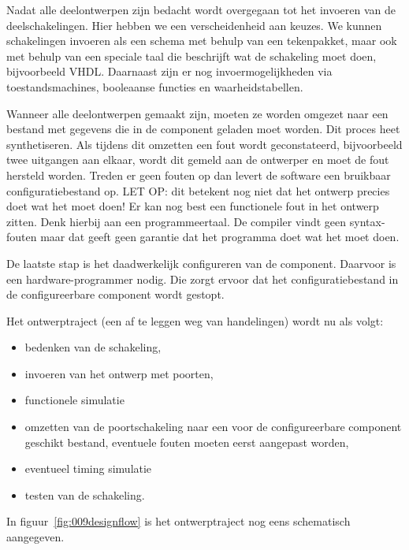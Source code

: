 \documentclass[a4paper,12pt,fleqn,twoside]{book}
\begin{document}
Nadat alle deelontwerpen zijn bedacht wordt overgegaan tot het invoeren van de
deelschakelingen. Hier hebben we een verscheidenheid aan keuzes. We kunnen
schakelingen invoeren als een schema met behulp van een tekenpakket, maar ook
met behulp van een speciale taal die beschrijft wat de schakeling moet doen,
bijvoorbeeld VHDL. Daarnaast zijn er nog invoermogelijkheden via
toestandsmachines, booleaanse functies en waarheidstabellen.

Wanneer alle deelontwerpen gemaakt zijn, moeten ze worden omgezet naar een
bestand met gegevens die in de component geladen moet worden. Dit proces heet
synthetiseren. Als tijdens dit omzetten een fout wordt geconstateerd,
bijvoorbeeld twee uitgangen aan elkaar, wordt dit gemeld aan de ontwerper en
moet de fout hersteld worden. Treden er geen fouten op dan levert de software
een bruikbaar configuratiebestand op. LET OP: dit betekent nog niet dat het
ontwerp precies doet wat het moet doen! Er kan nog best een functionele fout
in het ontwerp zitten. Denk hierbij aan een programmeertaal. De compiler vindt
geen syntax-fouten maar dat geeft geen garantie dat het programma doet wat het
moet doen.

De laatste stap is het daadwerkelijk configureren van de component. Daarvoor is
een hardware-programmer nodig. Die zorgt ervoor dat het configuratiebestand in
de configureerbare component wordt gestopt.

\newpage
Het ontwerptraject (een af te leggen weg van handelingen) wordt nu als volgt:

\begin{itemize}\itemsep-1pt
\item bedenken van de schakeling,
\item invoeren van het ontwerp met poorten,
\item functionele simulatie
\item omzetten van de poortschakeling naar een voor de configureerbare
      component geschikt bestand, eventuele fouten moeten eerst aangepast
      worden,
\item eventueel timing simulatie
\item testen van de schakeling.
\end{itemize}

In figuur~\ref{fig:009designflow} is het ontwerptraject nog eens schematisch
aangegeven.
 
\end{document}
